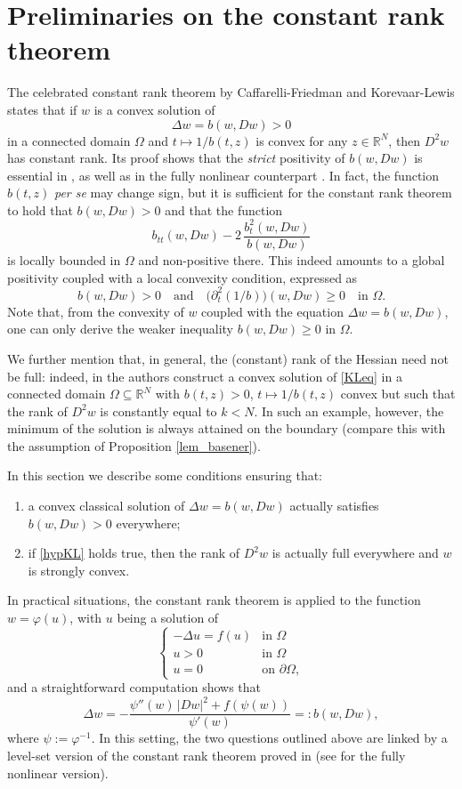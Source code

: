\documentclass[12pt]{amsart}
\numberwithin{equation}{section}
\theoremstyle{plain}
\theoremstyle{plain}
\theoremstyle{plain}
\theoremstyle{definition}
\newcommand{\R}{{\mathbb R}}
\newcommand{\beq}{\begin{equation}}
\newcommand{\eeq}{\end{equation}}
\renewcommand{\ge}{\geqslant}
\begin{document}
\section{Preliminaries on the constant rank theorem}
 \label{sec_CRT}

 The celebrated constant rank theorem by Caffarelli-Friedman \cite{CaFr85} and Korevaar-Lewis \cite{KoLe87} states that if $w$ is a convex solution of 
\beq
 \label{KLeq}
 \Delta w = b(w, Dw)>0
\eeq
 in a connected domain $\Omega$ and $t\mapsto 1/b(t, z)$ is convex for any $z\in \R^N$, then $D^2w$ has constant rank. 
Its proof shows that the {\em strict} positivity of $b(w, Dw)$ is essential in \cite{KoLe87}, as well as in the fully nonlinear counterpart \cite{BiGu09}. In fact, the function $b(t, z)$ {\em per se} may change sign, but it is sufficient for the constant rank theorem to hold that $b(w, Dw)>0$ and that the function
 \[
 b_{tt}(w, Dw)- 2\, \frac{b_t^2(w, Dw)}{b(w, Dw)}
 \]
is locally bounded in $\Omega$ and non-positive there. 
This indeed amounts to a global positivity coupled with a local convexity condition, expressed as 
\beq
\label{hypKL}
b(w, Dw)>0\quad \text{and} \quad \big(\partial^2_t (1/b)\big)(w, Dw)\ge 0 \quad \text{in $\Omega$}.
\eeq
 Note that, from the convexity of $w$ coupled with the equation $\Delta w=b(w, Dw)$, one can only derive the weaker inequality $b(w, Dw)\ge 0$ in $\Omega$. 

We further mention that, in general, the (constant) rank of the Hessian need not be full: indeed, in \cite[Section 5]{KoLe87} the authors construct a convex solution of \eqref{KLeq} in a connected domain $\Omega\subseteq \R^N$ with $b(t, z)>0$, $t\mapsto 1/b(t, z)$ convex but such that the rank of $D^2w$ is constantly equal to $k<N$. 
In such an example, however, the minimum of the solution is always attained on the boundary (compare this with the assumption of Proposition \ref{lem_basener}).
 
In this section we describe some conditions ensuring that:
\begin{enumerate}
\item \label{goal_i}
a convex classical solution of $\Delta w=b(w, Dw)$ actually satisfies $b(w, Dw)>0$ everywhere;
\item \label{goal_ii}
if \eqref{hypKL} holds true, then the rank of $D^2w$ is actually full everywhere and $w$ is strongly convex. 
\end{enumerate}

In practical situations, the constant rank theorem is applied to the function $w=\varphi(u)$, with $u$ being a solution of 
\beq
\label{gensemilinear}
\begin{cases}
 -\Delta u=f(u)&\text{in $\Omega$}\\
 u>0&\text{in $\Omega$}\\
 u=0&\text{on $\partial\Omega$},
 \end{cases}
 \eeq
and a straightforward computation shows that
\beq
\label{deltaw}
\Delta w = -\frac{\psi''(w)\, |Dw|^2 +f(\psi(w))}{\psi'(w)} =:b(w,Dw),
\eeq
where $\psi:=\varphi^{-1}$. In this setting, the two questions outlined above are linked by a level-set version of the constant rank theorem proved in \cite{Kor90} (see \cite{BGMX11} for the fully nonlinear version). 
\end{document}
